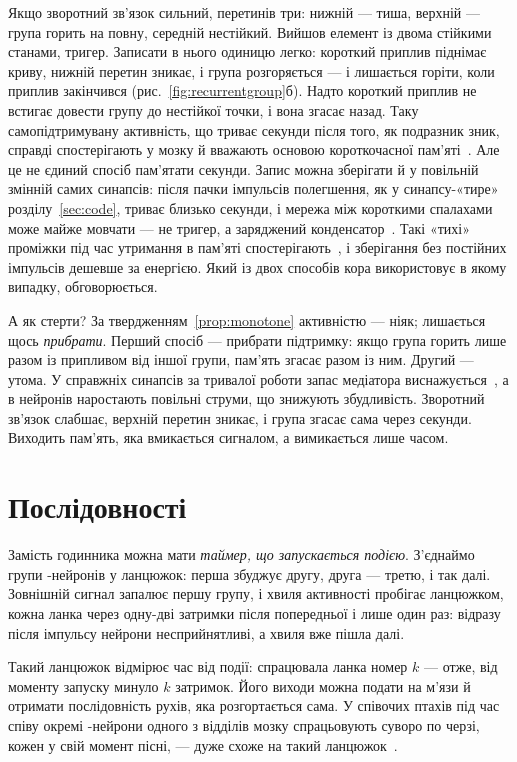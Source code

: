 Якщо зворотний зв'язок сильний, перетинів три: нижній --- тиша, верхній --- група горить на повну, середній нестійкий. Вийшов елемент із двома стійкими станами, тригер. Записати в нього одиницю легко: короткий приплив піднімає криву, нижній перетин зникає, і група розгоряється --- і лишається горіти, коли приплив закінчився (рис.~\ref{fig:recurrentgroup}б). Надто короткий приплив не встигає довести групу до нестійкої точки, і вона згасає назад. Таку самопідтримувану активність, що триває секунди після того, як подразник зник, справді спостерігають у мозку й вважають основою короткочасної пам'яті~\cite{Wang2001}. Але це не єдиний спосіб пам'ятати секунди. Запис можна зберігати й у повільній змінній самих синапсів: після пачки імпульсів полегшення, як у синапсу-«тире» розділу~\ref{sec:code}, триває близько секунди, і мережа між короткими спалахами може майже мовчати --- не тригер, а заряджений конденсатор~\cite{Mongillo2008}. Такі «тихі» проміжки під час утримання в пам'яті спостерігають~\cite{Stokes2015}, і зберігання без постійних імпульсів дешевше за енергією. Який із двох способів кора використовує в якому випадку, обговорюється.

А як стерти? За твердженням~\ref{prop:monotone} активністю --- ніяк; лишається щось \emph{прибрати}. Перший спосіб --- прибрати підтримку: якщо група горить лише разом із припливом від іншої групи, пам'ять згасає разом із ним. Другий --- утома. У справжніх синапсів за тривалої роботи запас медіатора виснажується~\cite{Tsodyks1997}, а в нейронів наростають повільні струми, що знижують збудливість. Зворотний зв'язок слабшає, верхній перетин зникає, і група згасає сама через секунди. Виходить пам'ять, яка вмикається сигналом, а вимикається лише часом.

\section{Послідовності}

Замість годинника можна мати \emph{таймер, що запускається подією}. З'єднаймо групи -нейронів у ланцюжок: перша збуджує другу, друга --- третю, і так далі. Зовнішній сигнал запалює першу групу, і хвиля активності пробігає ланцюжком, кожна ланка через одну-дві затримки після попередньої і лише один раз: відразу після імпульсу нейрони несприйнятливі, а хвиля вже пішла далі.

Такий ланцюжок відмірює час від події: спрацювала ланка номер $k$ --- отже, від моменту запуску минуло $k$ затримок. Його виходи можна подати на м'язи й отримати послідовність рухів, яка розгортається сама. У співочих птахів під час співу окремі -нейрони одного з відділів мозку спрацьовують суворо по черзі, кожен у свій момент пісні, --- дуже схоже на такий ланцюжок~\cite{Hahnloser2002}.

